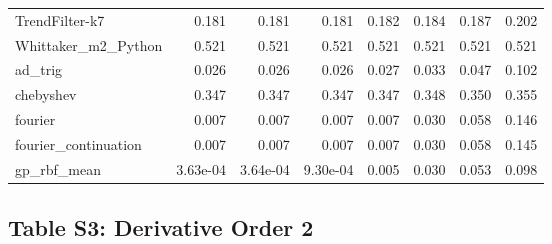 \documentclass[10pt]{article}
\begin{document}
\begin{longtable}{lrrrrrrr}
TrendFilter-k7 & 0.181 & 0.181 & 0.181 & 0.182 & 0.184 & 0.187 & 0.202 \\
Whittaker\_m2\_Python & 0.521 & 0.521 & 0.521 & 0.521 & 0.521 & 0.521 & 0.521 \\
ad\_trig & 0.026 & 0.026 & 0.026 & 0.027 & 0.033 & 0.047 & 0.102 \\
chebyshev & 0.347 & 0.347 & 0.347 & 0.347 & 0.348 & 0.350 & 0.355 \\
fourier & 0.007 & 0.007 & 0.007 & 0.007 & 0.030 & 0.058 & 0.146 \\
fourier\_continuation & 0.007 & 0.007 & 0.007 & 0.007 & 0.030 & 0.058 & 0.145 \\
gp\_rbf\_mean & 3.63e-04 & 3.64e-04 & 9.30e-04 & 0.005 & 0.030 & 0.053 & 0.098 \\
\bottomrule
\end{longtable}

\clearpage

\subsection*{Table S3: Derivative Order 2}
\end{document}
